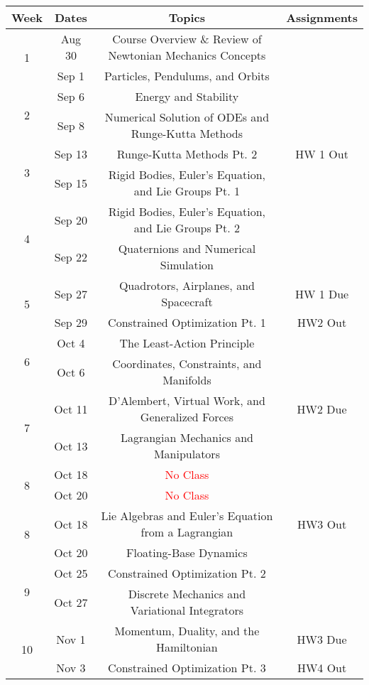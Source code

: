\documentclass[11pt,letterpaper]{article}
\begin{document}
\begin{tabular}{c|c|c|c}
	Week & Dates & Topics & Assignments \\
	\hline
	\multirow{2}{*}{1} & Aug 30 & Course Overview \& Review of Newtonian Mechanics Concepts \\
	 & Sep 1 & Particles, Pendulums, and Orbits &  \\
	\hline
	\multirow{2}{*}{2} & Sep 6 & Energy and Stability &  \\
	 & Sep 8 & Numerical Solution of ODEs and Runge-Kutta Methods &  \\
	\hline
	\multirow{2}{*}{3} & Sep 13 & Runge-Kutta Methods Pt. 2 & HW 1 Out \\
	 & Sep 15 & Rigid Bodies, Euler's Equation, and Lie Groups Pt. 1 &  \\
	\hline
	\multirow{2}{*}{4} & Sep 20 & Rigid Bodies, Euler's Equation, and Lie Groups Pt. 2 &  \\
	 & Sep 22 & Quaternions and Numerical Simulation & \\
	\hline
	\multirow{2}{*}{5} & Sep 27 & Quadrotors, Airplanes, and Spacecraft & HW 1 Due \\
	 & Sep 29 & Constrained Optimization Pt. 1 & HW2 Out \\
	\hline
	\multirow{2}{*}{6}  & Oct 4 & The Least-Action Principle &  \\
	 & Oct 6 & Coordinates, Constraints, and Manifolds & \\
	\hline
	\multirow{2}{*}{7}  & Oct 11 & D'Alembert, Virtual Work, and Generalized Forces &  HW2 Due\\
	 & Oct 13 & Lagrangian Mechanics and Manipulators &  \\
	\hline
	\multirow{2}{*}{8}  & Oct 18 & \textcolor{red}{No Class} & \\
	 & Oct 20 & \textcolor{red}{No Class} & \\
	\hline
	\multirow{2}{*}{8}  & Oct 18 & Lie Algebras and Euler's Equation from a Lagrangian & HW3 Out \\
	 & Oct 20 & Floating-Base Dynamics & \\
	\hline
	\multirow{2}{*}{9}  & Oct 25 & Constrained Optimization Pt. 2 & \\
	 & Oct 27 & Discrete Mechanics and Variational Integrators &   \\
	\hline
	\multirow{2}{*}{10}  & Nov 1 & Momentum, Duality, and the Hamiltonian &  HW3 Due \\
	 & Nov 3 & Constrained Optimization Pt. 3 & HW4 Out\\

\end{tabular}
\end{document}
